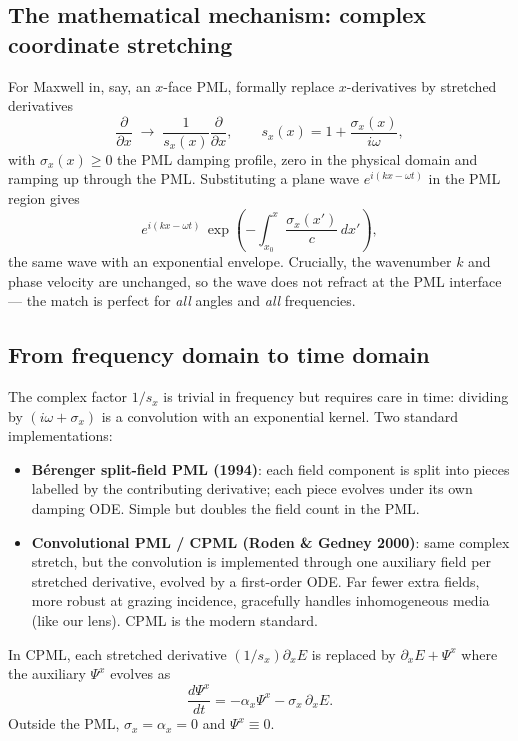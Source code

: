 \documentclass[11pt]{article}
\begin{document}
\subsection{The mathematical mechanism: complex coordinate stretching}

For Maxwell in, say, an $x$-face PML, formally replace
$x$-derivatives by stretched derivatives
\begin{equation}
  \frac{\partial}{\partial x} \;\longrightarrow\;
  \frac{1}{s_x(x)} \frac{\partial}{\partial x},
  \qquad
  s_x(x) = 1 + \frac{\sigma_x(x)}{i\omega},
  \label{eq:pml-stretch}
\end{equation}
with $\sigma_x(x) \geq 0$ the PML damping profile, zero in the
physical domain and ramping up through the PML.  Substituting a
plane wave $e^{i(kx - \omega t)}$ in the PML region gives
\[
  e^{i(kx - \omega t)}\,
  \exp\!\left(-\int_{x_0}^x \frac{\sigma_x(x')}{c}\, dx'\right),
\]
the same wave with an exponential envelope.  Crucially, the
wavenumber $k$ and phase velocity are unchanged, so the wave does
not refract at the PML interface --- the match is perfect for
\emph{all} angles and \emph{all} frequencies.

\subsection{From frequency domain to time domain}

The complex factor $1/s_x$ is trivial in frequency but requires
care in time: dividing by $(i\omega + \sigma_x)$ is a convolution
with an exponential kernel.  Two standard implementations:
\begin{itemize}[itemsep=2pt,topsep=2pt]
  \item \textbf{Bérenger split-field PML (1994)}: each field
        component is split into pieces labelled by the contributing
        derivative; each piece evolves under its own damping ODE.
        Simple but doubles the field count in the PML.
  \item \textbf{Convolutional PML / CPML (Roden \& Gedney 2000)}:
        same complex stretch, but the convolution is implemented
        through one auxiliary field per stretched derivative,
        evolved by a first-order ODE.  Far fewer extra fields,
        more robust at grazing incidence, gracefully handles
        inhomogeneous media (like our lens).  CPML is the modern
        standard.
\end{itemize}
In CPML, each stretched derivative $(1/s_x)\partial_x E$ is
replaced by $\partial_x E + \Psi^x$ where the auxiliary $\Psi^x$
evolves as
\[
  \frac{d\Psi^x}{dt} = -\alpha_x \Psi^x - \sigma_x\, \partial_x E.
\]
Outside the PML, $\sigma_x = \alpha_x = 0$ and $\Psi^x \equiv 0$.
\end{document}
